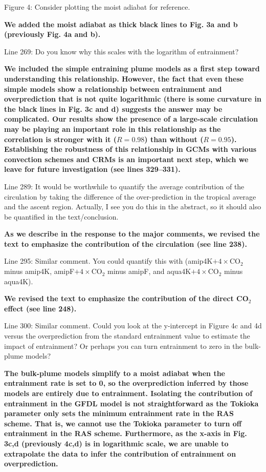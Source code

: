 \documentclass[11pt]{article}
\begin{document}
Figure 4: Consider plotting the moist adiabat for reference.

\textbf{We added the moist adiabat as thick black lines to Fig. 3a and b (previously Fig. 4a and b).}

Line 269: Do you know why this scales with the logarithm of entrainment?

\textbf{We included the simple entraining plume models as a first step toward understanding this relationship. However, the fact that even these simple models show a relationship between entrainment and overprediction that is not quite logarithmic (there is some curvature in the black lines in Fig. 3c and d) suggests the answer may be complicated. Our results show the presence of a large-scale circulation may be playing an important role in this relationship as the correlation is stronger with it (\(R=0.98\)) than without (\(R=0.95\)). Establishing the robustness of this relationship in GCMs with various convection schemes and CRMs is an important next step, which we leave for future investigation (see lines 329--331).}

Line 289: It would be worthwhile to quantify the average contribution of the circulation by taking the difference of the over-prediction in the tropical average and the ascent region. Actually, I see you do this in the abstract, so it should also be quantified in the text/conclusion.

\textbf{As we describe in the response to the major comments, we revised the text to emphasize the contribution of the circulation (see line 238).}

Line 295: Similar comment. You could quantify this with (amip4K\(+4\times\)CO\(_2\) minus amip4K, amipF\(+4\times\)CO\(_2\) minus amipF, and aqua4K\(+4\times\)CO\(_2\) minus aqua4K).

\textbf{We revised the text to emphasize the contribution of the direct CO\(_2\) effect (see line 248).}

Line 300: Similar comment. Could you look at the y-intercept in Figure 4c and 4d versus the overprediction from the standard entrainment value to estimate the impact of entrainment? Or perhaps you can turn entrainment to zero in the bulk-plume models?

\textbf{The bulk-plume models simplify to a moist adiabat when the entrainment rate is set to 0, so the overprediction inferred by those models are entirely due to entrainment. Isolating the contribution of entrainment in the GFDL model is not straightforward as the Tokioka parameter only sets the minimum entrainment rate in the RAS scheme. That is, we cannot use the Tokioka parameter to turn off entrainment in the RAS scheme. Furthermore, as the x-axis in Fig. 3c,d (previously 4c,d) is in logarithmic scale, we are unable to extrapolate the data to infer the contribution of entrainment on overprediction.}
\end{document}
